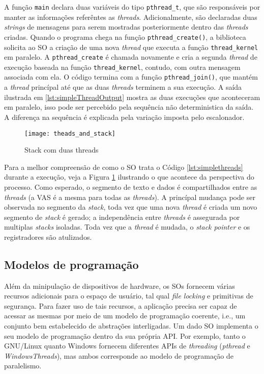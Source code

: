 A função \texttt{main} declara duas variáveis do tipo \texttt{pthread\_t}, que
são responsáveis por manter as informações referêntes as \emph{threads}.
Adicionalmente, são declaradas duas \emph{strings} de mensagens para serem
mostradas posteriormente dentro das \emph{threads} criadas. Quando o programa
chega na função \texttt{pthread\_create()}, a biblioteca solicita ao SO a
criação de uma nova \emph{thread} que executa a função \texttt{thread\_kernel}
em paralelo. A \texttt{pthread\_create} é chamada novamente e cria a segunda
\emph{thread} de execução baseada na função \texttt{thread\_kernel}, contudo,
com outra mensagem associada com ela. O código termina com a função
\texttt{pthread\_join()}, que mantém a \emph{thread} princípal até que as duas
\emph{threads} terminem a sua execução. A saída ilustrada em
\ref{lst:simpleThreadOutput} mostra as duas execuções que aconteceram em
paralelo, isso pode ser percebido pela sequência não deterministica da saída. A
diferença na sequência é explicada pela variação imposta pelo escalonador.

\begin{figure}[!h]
  \centering
  \texttt{[image: theads\_and\_stack]} 
  \caption{Stack com duas threads}
  \label{fig:stack_threads} 
\end{figure}

Para a melhor compreensão de como o SO trata o Código \ref{lst:simplethreads}
durante a execução, veja a Figura \ref{fig:stack_threads} ilustrando o que
acontece da perspectiva do processo. Como esperado, o segmento de texto e dados
é compartilhados entre as \emph{threads} (a VAS é a mesma para todas as
\emph{threads}). A princípal mudança pode ser observada no segmento da
\emph{stack}, toda vez que uma nova \emph{thread} é criada um novo segmento de
\emph{stack} é gerado; a independência entre \emph{threads} é assegurada por
multiplas \emph{stacks} isoladas. Toda vez que a \emph{thread} é mudada, o
\emph{stack pointer} e os registradores são atulizados.

\subsection{Modelos de programação}

Além da minipulação de dispositivos de hardware, os SOs fornecem várias
recursos adicionais para o espaço de usuário, tal qual \emph{file locking} e
primitivas de segurança. Para fazer uso de tais recursos, a aplicação precisa
ser capaz de acessar as mesmas por meio de um modelo de programação coerente,
i.e., um conjunto bem estabelecido de abstrações interligadas. Um dado SO
implementa o seu modelo de programação dentro da sua própria API. Por exemplo,
tanto o GNU/Linux quanto Windows fornecem diferentes APIs de \emph{threading}
(\emph{pthread} e \emph{WindowsThreads}), mas ambos corresponde ao modelo de
programação de paralelismo.

